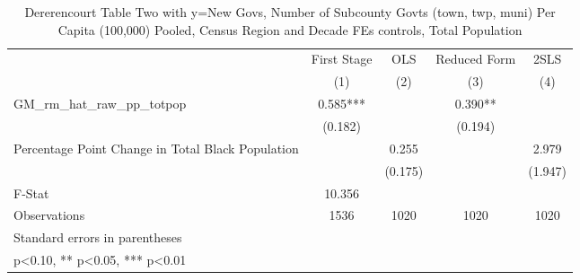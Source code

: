 \begin{table}[htbp]\centering
\def\sym#1{\ifmmode^{#1}\else\(^{#1}\)\fi}
\caption{Dererencourt Table Two with y=New Govs, Number of Subcounty Govts (town, twp, muni) Per Capita (100,000) Pooled, Census Region and Decade FEs controls, Total Population}
\begin{tabular}{l*{4}{c}}
\toprule
                    & First Stage   &         OLS   &Reduced Form   &        2SLS   \\
                    &\multicolumn{1}{c}{(1)}   &\multicolumn{1}{c}{(2)}   &\multicolumn{1}{c}{(3)}   &\multicolumn{1}{c}{(4)}   \\
\midrule
GM\_rm\_hat\_raw\_pp\_totpop&       0.585***&               &       0.390** &               \\
                    &     (0.182)   &               &     (0.194)   &               \\
\addlinespace
Percentage Point Change in Total Black Population&               &       0.255   &               &       2.979   \\
                    &               &     (0.175)   &               &     (1.947)   \\
\midrule
F-Stat              &      10.356   &               &               &               \\
Observations        &        1536   &        1020   &        1020   &        1020   \\
\bottomrule
\multicolumn{5}{l}{\footnotesize Standard errors in parentheses}\\
\multicolumn{5}{l}{\footnotesize * p<0.10, ** p<0.05, *** p<0.01}\\
\end{tabular}
\end{table}
